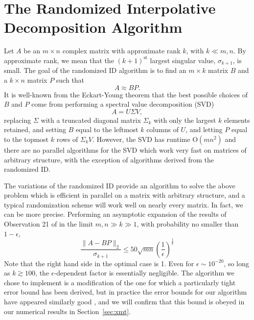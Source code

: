\documentclass[11pt]{article}
\begin{document}
\section{The Randomized Interpolative Decomposition Algorithm}
Let $A$ be an $m\times n$ complex matrix with approximate rank $k$, with $k\ll m,n$.  By approximate rank, we mean that the $(k+1)^{\mathrm{st}}$ largest singular value, $\sigma_{k+1}$, is small. The goal of the randomized ID algorithm \cite{rokpnas} is to find an $m\times k $ matrix $B$ and a $k \times n$ matrix $P$ such that \begin{equation}
A\approx BP.
\end{equation}It is well-known from the Eckart-Young theorem \cite{eckart} that the best possible choices of $B$ and $P$ come from performing a spectral value decomposition (SVD) \begin{equation}
A=U\Sigma V,
\end{equation} replacing $\Sigma$ with a truncated diagonal matrix $\Sigma_k$ with only the largest $k$ elements retained, and setting $B$ equal to the leftmost $k$ columns of $U$, and letting $P$ equal to the topmost $k$ rows of $\Sigma_k V$.  However, the SVD has runtime $\mathrm{O}(mn^2)$ and there are no parallel algorithms for the SVD which work very fast on matrices of arbitrary structure, with the exception of algorithms derived from the randomized ID.

The variations of the randomized ID provide an algorithm to solve the above problem which is efficient in parallel on a matrix with arbitrary structure, and a typical randomization scheme will work well on nearly every matrix.   In fact, we can be more precise.   Performing an asymptotic expansion of the results of Observation 21 of \cite{rokyale1} in the limit $m,n \gg k \gg 1$, with probability no smaller than $1-\epsilon$,\begin{equation}
\frac{\| A-BP \|_2}{\sigma_{k+1}} \le 50 \sqrt{mn} \left(\frac{1}{\epsilon}\right)^{\frac{1}{k}} \label{eq:errorbound}
\end{equation}
Note that the right hand side in the optimal case is 1.   Even for $\epsilon \sim 10^{-20}$, so long as $k \gtrsim 100$, the $\epsilon$-dependent factor is essentially negligible.  The algorithm we chose to implement is a modification of the one for which a particularly tight error bound has been derived, but in practice the error bounds for our algorithm have appeared similarly good \cite{rokyale2}, and we will confirm that this bound is obeyed in our numerical results in Section~\ref{sec:xmt}. 
\end{document}
